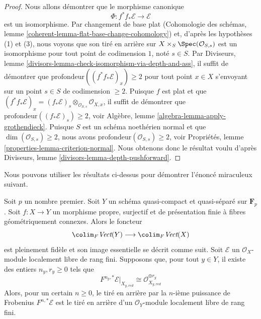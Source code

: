 \begin{proof}
Nous allons démontrer que le morphisme canonique
$$
\Phi : f^*f_*\mathcal{E} \longrightarrow \mathcal{E}
$$
est un isomorphisme. Par changement de base plat (Cohomologie des schémas, lemme
\ref{coherent-lemma-flat-base-change-cohomology})
et, d'après les hypothèses (1) et (3), nous voyons que
son tiré en arrière sur $X \times_S \Spec(\mathcal{O}_{S, s})$
est un isomorphisme pour tout point de codimension $1$, noté $s \in S$.
Par Diviseurs, lemme \ref{divisors-lemma-check-isomorphism-via-depth-and-ass},
il suffit de démontrer que $\text{profondeur}((f^*f_*\mathcal{E})_x) \geq 2$
pour tout point $x \in X$ s'envoyant sur un point $s \in S$ de codimension $\geq 2$.
Puisque $f$ est plat et que
$(f^*f_*\mathcal{E})_x = (f_*\mathcal{E})_s \otimes_{\mathcal{O}_{S, s}}
\mathcal{O}_{X, x}$, il suffit de démontrer que
$\text{profondeur}((f_*\mathcal{E})_s) \geq 2$, voir
Algèbre, lemme \ref{algebra-lemma-apply-grothendieck}.
Puisque $S$ est un schéma noethérien normal
et que $\dim(\mathcal{O}_{S, s}) \geq 2$,
nous avons $\text{profondeur}(\mathcal{O}_{S, s}) \geq 2$, voir
Propriétés, lemme \ref{properties-lemma-criterion-normal}.
Nous obtenons donc le résultat voulu d'après
Diviseurs, lemme \ref{divisors-lemma-depth-pushforward}.
\end{proof}

\noindent
Nous pouvons utiliser les résultats ci-dessus pour démontrer l'énoncé
miraculeux suivant.

\begin{theorem}
\label{theorem-pullback-trivial-fibres}
Soit $p$ un nombre premier. Soit $Y$ un schéma quasi-compact et quasi-séparé
sur $\mathbf{F}_p$.
Soit $f : X \to Y$ un morphisme propre, surjectif et de présentation finie
à fibres géométriquement connexes.
Alors le foncteur
$$
\colim_F \textit{Vect}(Y) \longrightarrow \colim_F \textit{Vect}(X)
$$
est pleinement fidèle et son image essentielle se décrit comme suit.
Soit $\mathcal{E}$ un $\mathcal{O}_X$-module localement libre de rang fini.
Supposons que, pour tout $y \in Y$, il existe des entiers $n_y, r_y \geq 0$
tels que
$$
F^{n_y, *}\mathcal{E}|_{X_{y, red}}
\cong
\mathcal{O}_{X_{y, red}}^{\oplus r_y}
$$
Alors, pour un certain $n \geq 0$, le tiré en arrière par la $n$-ième puissance de Frobenius
$F^{n, *}\mathcal{E}$ est le tiré en arrière d'un
$\mathcal{O}_Y$-module localement libre de rang fini.
\end{theorem}

